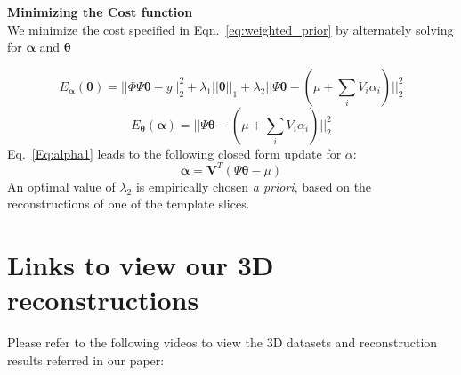 \documentclass{article}
\begin{document}
\textbf{Minimizing the Cost function}\\

We minimize the cost specified in Eqn.~\ref{eq:weighted_prior} by alternately solving for $\boldsymbol{\alpha}$ and $\boldsymbol{\theta}$

\begin{equation}
E_{\boldsymbol{\alpha}}(\boldsymbol{\theta}) = ||\Phi\Psi\boldsymbol{\theta}- y||_2^2  + \lambda_1||\boldsymbol{\theta}||_1+\lambda_2||\Psi\boldsymbol{\theta} - (\mu + \sum_{i}V_i\alpha_i)||_2^2
\label{Eq:primaryObj}
\end{equation}
\begin{equation}
E_{\boldsymbol\theta}(\boldsymbol{\alpha}) = ||\Psi\boldsymbol{\theta} - (\mu + \sum_{i}V_i\alpha_i)||_2^2
\label{Eq:alpha1}
\end{equation}
Eq.~\ref{Eq:alpha1} leads to the following closed form update for $\alpha$:
\begin{equation}
\boldsymbol{\alpha} = \boldsymbol{V}^T(\Psi\boldsymbol{\theta} - \mu)
\label{Eq:alpha}
\end{equation}
An optimal value of $\lambda_2$ is empirically chosen \textit{a priori}, based on the reconstructions of one of the template slices.


\newpage
\section{Links to view our 3D reconstructions}

Please refer to the following videos to view the 3D datasets and reconstruction results referred in our paper:
\end{document}
